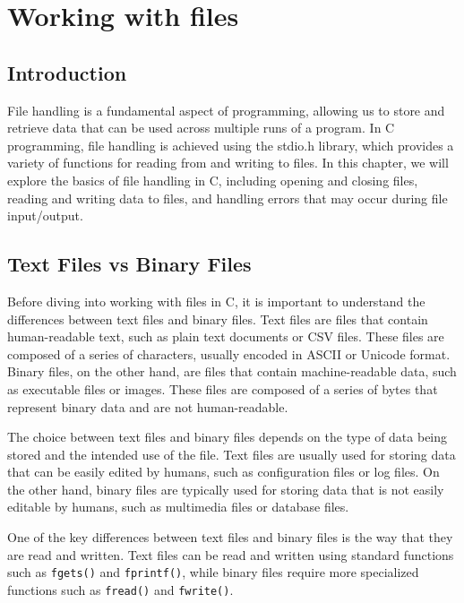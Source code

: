 
\chapter{Working with files}
\label{files}


\section{Introduction}
File handling is a fundamental aspect of programming, allowing us to store and retrieve
data that can be used across multiple runs of a program. In C programming, file handling
is achieved using the stdio.h library, which provides a variety of functions for reading
from and writing to files. In this chapter, we will explore the basics of file handling
in C, including opening and closing files, reading and writing data to files, and
handling errors that may occur during file input/output.

\section{Text Files vs Binary Files}
Before diving into working with files in C, it is important to understand the differences
between text files and binary files. Text files are files that contain human-readable
text, such as plain text documents or CSV files. These files are composed of a series of
characters, usually encoded in ASCII or Unicode format. Binary files, on the other hand,
are files that contain machine-readable data, such as executable files or images. These
files are composed of a series of bytes that represent binary data and are not
human-readable.

The choice between text files and binary files depends on the type of data being stored
and the intended use of the file. Text files are usually used for storing data that can
be easily edited by humans, such as configuration files or log files. On the other hand,
binary files are typically used for storing data that is not easily editable by humans,
such as multimedia files or database files.

One of the key differences between text files and binary files is the way that they are
read and written. Text files can be read and written using standard functions such as
{\tt fgets()} and {\tt fprintf()}, while binary files require more specialized functions
such as {\tt fread()} and {\tt fwrite()}.

